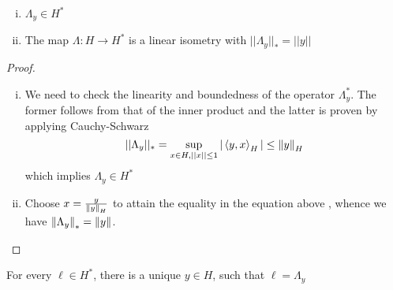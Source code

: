 \documentclass{article}
\begin{document}
\begin{lemma}
	\hfill
	\begin{enumerate}[i)]
		\item  \(\Lambda_y \in H^*\)
		\item The map  \(\Lambda: H \to H^*\) is a linear isometry with  \(||\Lambda_y||_{*}=||y||\)
	\end{enumerate}
\end{lemma}

\begin{proof}
	\begin{enumerate}[i)]
		\item We need to check the linearity and boundedness of the operator  \(\Lambda_y^*\). The former follows from that of the inner product and the latter is proven by applying Cauchy-Schwarz
		      \begin{equation*}
			      ||\Lambda_y||_* = \sup_{x\in H, ||x|| \leq 1} |\left<{y},{x}\right>_H| \leq \left\|{y}\right\|_H
		      \end{equation*}
		      which implies  \(\Lambda_y \in H^*\)

		\item Choose  \(x = \frac{y}{\left\|{y}\right\|_H}\) to attain the equality in the equation above , whence we have  \(\left\|{\Lambda_y}\right\|_*=\left\|{y}\right\|\).
	\end{enumerate}
\end{proof}

\begin{theorem}
	 \nl
	\label{riesz representation}
	For every  \(\ell \in H^*\), there is a unique  \(y \in H\), such that  \(\ell=\Lambda_y\)
\end{theorem}
\end{document}
